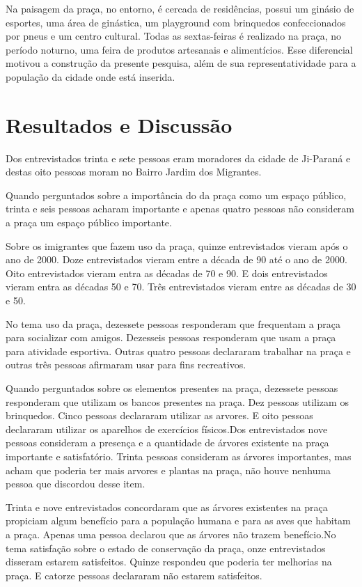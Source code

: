 \documentclass[article,12pt,onesidea,4paper,english,brazil]{abntex2}
\begin{document}
	Na paisagem da praça, no entorno, é cercada de residências, possui um ginásio de esportes, uma área de ginástica, um playground com brinquedos confeccionados por pneus e um centro cultural. Todas as sextas-feiras é realizado na praça, no período noturno, uma feira de produtos artesanais e alimentícios. Esse diferencial motivou a construção da presente pesquisa, além de sua representatividade para a população da cidade onde está inserida.
	
	\section*{Resultados e Discussão}
	
	Dos entrevistados trinta e sete pessoas eram moradores da cidade de Ji-Paraná e destas oito pessoas moram no Bairro Jardim dos Migrantes.
	
	Quando perguntados sobre a importância do da praça como um espaço público, trinta e seis pessoas acharam importante e apenas quatro pessoas não consideram a praça um espaço público importante.
	
	Sobre os imigrantes que fazem uso da praça, quinze entrevistados vieram após o ano de 2000. Doze entrevistados vieram entre a década de 90 até o ano de 2000. Oito entrevistados vieram entra as décadas de 70 e 90. E dois entrevistados vieram entra as décadas 50 e 70. Três entrevistados vieram entre as décadas de 30 e 50.
	
	No tema uso da praça, dezessete pessoas responderam que frequentam a praça para socializar com amigos. Dezesseis pessoas responderam que usam a praça para atividade esportiva. Outras quatro pessoas declararam trabalhar na praça e outras três pessoas afirmaram usar para fins recreativos.
	
	Quando perguntados sobre os elementos presentes na praça, dezessete pessoas responderam que utilizam os bancos presentes na praça. Dez pessoas utilizam os brinquedos. Cinco pessoas declararam utilizar as arvores. E  oito pessoas declararam utilizar os aparelhos de exercícios físicos.Dos entrevistados nove pessoas consideram a presença e a quantidade de árvores existente na praça importante e satisfatório. Trinta pessoas consideram as árvores importantes, mas acham que poderia ter mais arvores e plantas na praça, não houve nenhuma pessoa que discordou desse item.
	
	Trinta e nove entrevistados concordaram que as árvores existentes na praça propiciam algum benefício para a população humana e para as aves que habitam a praça. Apenas uma pessoa declarou que as árvores não trazem benefício.No tema satisfação sobre o estado de conservação da praça, onze entrevistados disseram estarem satisfeitos. Quinze respondeu que poderia ter
	melhorias na praça. E catorze pessoas declararam não estarem satisfeitos.
	
\end{document}
